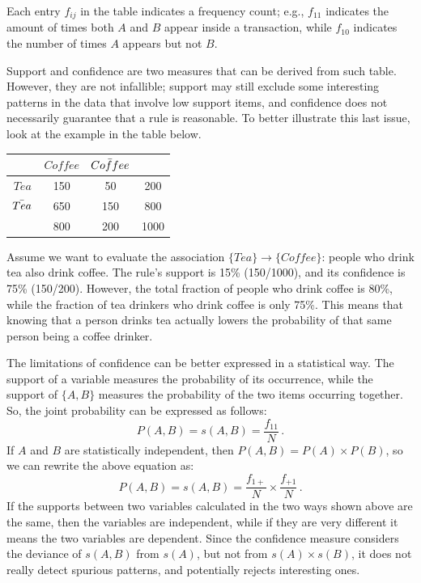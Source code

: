 Each entry $f_{ij}$ in the table indicates a frequency count; e.g., $f_{11}$ indicates the amount of times both $A$ and $B$ appear inside a transaction, while $f_{10}$ indicates the number of times $A$ appears but not $B$.

Support and confidence are two measures that can be derived from such table. However, they are not infallible; support may still exclude some interesting patterns in the data that involve low support items, and confidence does not necessarily guarantee that a rule is reasonable. To better illustrate this last issue, look at the example in the table below.

\begin{table}[h]
    \centering
    \begin{tabular}{c|ccc}
         & $Coffee$ & $\Bar{Coffee}$ & \\
         \hline
         $Tea$ & 150 & 50 & 200 \\
         $\Bar{Tea}$ & 650 & 150 & 800 \\
         & 800 & 200 & 1000 \\
    \end{tabular}
\end{table}

Assume we want to evaluate the association $\{Tea\} \rightarrow \{Coffee\}$: people who drink tea also drink coffee. The rule's support is 15\% (150/1000), and its confidence is 75\% (150/200). However, the total fraction of people who drink coffee is 80\%, while the fraction of tea drinkers who drink coffee is only 75\%. This means that knowing that a person drinks tea actually lowers the probability of that same person being a coffee drinker.

The limitations of confidence can be better expressed in a statistical way. The support of a variable measures the probability of its occurrence, while the support of $\{A,B\}$ measures the probability of the two items occurring together. So, the joint probability can be expressed as follows:
\begin{equation*}
    P(A,B) = s(A,B) = \dfrac{f_{11}}{N}\,.
\end{equation*}
If $A$ and $B$ are statistically independent, then $P(A,B) = P(A) \times P(B)$, so we can rewrite the above equation as:
\begin{equation*}
    P(A,B) = s(A,B) = \dfrac{f_{1+}}{N} \times \dfrac{f_{+1}}{N}\,.
\end{equation*}
If the supports between two variables calculated in the two ways shown above are the same, then the variables are independent, while if they are very different it means the two variables are dependent. Since the confidence measure considers the deviance of $s(A,B)$ from $s(A)$, but not from $s(A) \times s(B)$, it does not really detect spurious patterns, and potentially rejects interesting ones.

